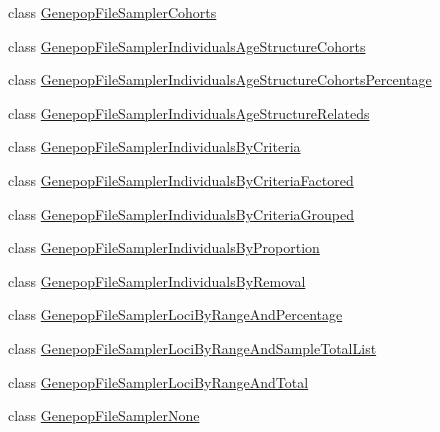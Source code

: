 \begin{DoxyCompactItemize}
\item 
class \hyperlink{classnegui_1_1genepopfilesampler_1_1GenepopFileSamplerCohorts}{Genepop\+File\+Sampler\+Cohorts}
\item 
class \hyperlink{classnegui_1_1genepopfilesampler_1_1GenepopFileSamplerIndividualsAgeStructureCohorts}{Genepop\+File\+Sampler\+Individuals\+Age\+Structure\+Cohorts}
\item 
class \hyperlink{classnegui_1_1genepopfilesampler_1_1GenepopFileSamplerIndividualsAgeStructureCohortsPercentage}{Genepop\+File\+Sampler\+Individuals\+Age\+Structure\+Cohorts\+Percentage}
\item 
class \hyperlink{classnegui_1_1genepopfilesampler_1_1GenepopFileSamplerIndividualsAgeStructureRelateds}{Genepop\+File\+Sampler\+Individuals\+Age\+Structure\+Relateds}
\item 
class \hyperlink{classnegui_1_1genepopfilesampler_1_1GenepopFileSamplerIndividualsByCriteria}{Genepop\+File\+Sampler\+Individuals\+By\+Criteria}
\item 
class \hyperlink{classnegui_1_1genepopfilesampler_1_1GenepopFileSamplerIndividualsByCriteriaFactored}{Genepop\+File\+Sampler\+Individuals\+By\+Criteria\+Factored}
\item 
class \hyperlink{classnegui_1_1genepopfilesampler_1_1GenepopFileSamplerIndividualsByCriteriaGrouped}{Genepop\+File\+Sampler\+Individuals\+By\+Criteria\+Grouped}
\item 
class \hyperlink{classnegui_1_1genepopfilesampler_1_1GenepopFileSamplerIndividualsByProportion}{Genepop\+File\+Sampler\+Individuals\+By\+Proportion}
\item 
class \hyperlink{classnegui_1_1genepopfilesampler_1_1GenepopFileSamplerIndividualsByRemoval}{Genepop\+File\+Sampler\+Individuals\+By\+Removal}
\item 
class \hyperlink{classnegui_1_1genepopfilesampler_1_1GenepopFileSamplerLociByRangeAndPercentage}{Genepop\+File\+Sampler\+Loci\+By\+Range\+And\+Percentage}
\item 
class \hyperlink{classnegui_1_1genepopfilesampler_1_1GenepopFileSamplerLociByRangeAndSampleTotalList}{Genepop\+File\+Sampler\+Loci\+By\+Range\+And\+Sample\+Total\+List}
\item 
class \hyperlink{classnegui_1_1genepopfilesampler_1_1GenepopFileSamplerLociByRangeAndTotal}{Genepop\+File\+Sampler\+Loci\+By\+Range\+And\+Total}
\item 
class \hyperlink{classnegui_1_1genepopfilesampler_1_1GenepopFileSamplerNone}{Genepop\+File\+Sampler\+None}
\end{DoxyCompactItemize}
